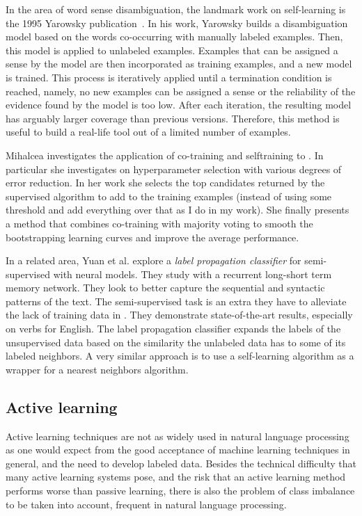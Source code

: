 In the area of word sense disambiguation, the landmark work on self-learning is
the 1995 Yarowsky publication~\cite{yarowsky-95}. In his work, Yarowsky builds
a disambiguation model based on the words co-occurring with manually labeled
examples. Then, this model is applied to unlabeled examples. Examples that can
be assigned a sense by the model are then incorporated as training examples,
and a new model is trained. This process is iteratively applied until a
termination condition is reached, namely, no new examples can be assigned a
sense or the reliability of the evidence found by the model is too low. After
each iteration, the resulting model has arguably larger coverage than previous
versions. Therefore, this method is useful to build a real-life tool out of a
limited number of examples.

Mihalcea \cite{mihalcea:2004:CONLL} investigates the application of co-training
and selftraining to \wsd. In particular she investigates on hyperparameter
selection with various degrees of error reduction. In her work she selects the
top candidates returned by the supervised algorithm to add to the training
examples (instead of using some threshold and add everything over that as I do
in my work). She finally presents a method that combines co-training with
majority voting to smooth the bootstrapping learning curves and improve the
average performance.

In a related area, Yuan et al. \cite{Yuan:2016aa} explore a {\em label
propagation classifier} for semi-supervised \wsd with neural models. They study
\wsd with a recurrent long-short term memory network. They look to better
capture the sequential and syntactic patterns of the text. The semi-supervised
task is an extra they have to alleviate the lack of training data in \wsd. They
demonstrate state-of-the-art results, especially on verbs for English. The
label propagation classifier expands the labels of the unsupervised data based
on the similarity the unlabeled data has to some of its labeled neighbors. A
very similar approach is to use a self-learning algorithm as a wrapper for a
nearest neighbors algorithm.

\subsection{Active learning}

Active learning techniques are not as widely used in natural language
processing as one would expect from the good acceptance of machine learning
techniques in general, and the need to develop labeled data. Besides the
technical difficulty that many active learning systems pose, and the risk that
an active learning method performs worse than passive learning, there is also
the problem of class imbalance to be taken into account, frequent in natural
language processing.

